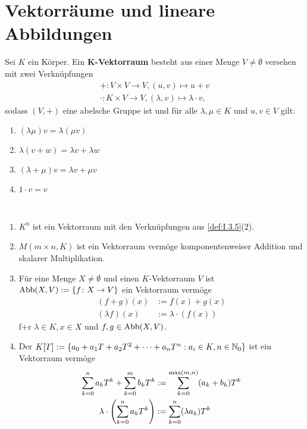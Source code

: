 \section{Vektorräume und lineare Abbildungen}
\begin{definition}[Vektorraum]
	\label{def:I.5.1}
	Sei $K$ ein Körper.
	Ein $\bm{K}$\textbf{-Vektorraum} besteht aus einer Menge $V \neq \emptyset$ versehen mit zwei Verknüpfungen 
	\begin{align*}
		+\colon V \times V \rightarrow V, (u,v) \mapsto u+v \\
		\cdot \colon K \times V \rightarrow V, (\lambda,v) \mapsto \lambda \cdot v,
	\end{align*}
	sodass $(V,+)$ eine abelsche Gruppe ist und für alle $\lambda, \mu \in K$ und $u,v \in V$ gilt:
	\begin{enumerate}[(1)]
		\item $(\lambda \mu) v = \lambda (\mu v)$
		\item $\lambda(v+w) = \lambda v + \lambda w$
		\item $(\lambda + \mu) v = \lambda v + \mu v$
		\item $1 \cdot v = v$
	\end{enumerate}
\end{definition}

\begin{beispiel}
	\label{bsp:I.5.2}
	\mbox{} \\[-1.4cm]
	\begin{enumerate}[(1)]
		\item $K^n$ ist ein Vektorraum mit den Verknüpfungen aus \autoref{def:I.3.5}(2).
		\item $M(m \times n,K)$ ist ein Vektorraum vermöge komponentenweiser Addition und skalarer Multiplikation.
		\item Für eine Menge $X \neq \emptyset$ und einen $K$-Vektorraum $V$ ist $\operatorname{Abb}(X,V) := \{f \colon X \rightarrow V\}$ ein Vektorraum vermöge
		\begin{align*}
			(f+g)(x) &:= f(x) + g(x) \\
			(\lambda f)(x) &:= \lambda \cdot (f(x))
		\end{align*}
		f+r $\lambda \in K, x \in X$ und $f,g \in \operatorname{Abb}(X,V)$.
		\item Der  $K[T] := \{a_0 + a_1 T + a_2 T^2 + \dots + a_n T^n : a_i \in K, n \in \mathbb{N}_0\}$ ist ein Vektorraum vermöge
		\begin{align*}
			\sum_{k=0}^{n} a_kT^k + \sum_{k=0}^{m} b_kT^k &:= \sum_{k=0}^{\max(m,n)} (a_k + b_k)T^k \\
			\lambda \cdot \left(\sum_{k=0}^{n} a_kT^k\right) &:= \sum_{k=0}^{n} (\lambda a_k)T^k
		\end{align*}
	\end{enumerate}	
\end{beispiel}

